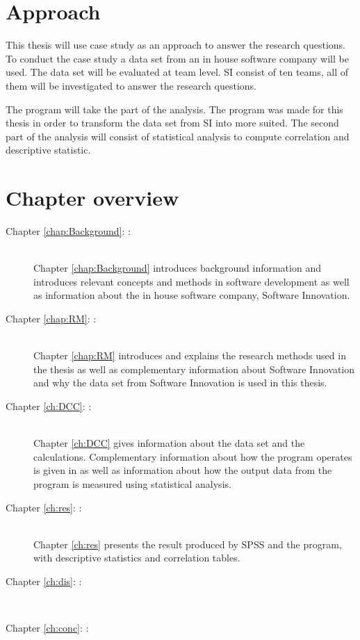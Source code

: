 \documentclass[UKenglish]{ifimaster}  %
\begin{document}
\section{Approach}
This thesis will use case study as an approach  to answer the research questions. To conduct the case study a data set from an in house software company will be used.  The data set will be evaluated at team level. SI consist of ten teams, all of them will be investigated to answer the research questions. 

The program will take the part of the analysis. The program was made for this thesis in order to transform the data set from SI into more suited. The second part of the analysis will consist of statistical analysis to compute correlation and descriptive statistic.
 

\section{Chapter overview}
\begin{description}
\item[Chapter \ref{chap:Background}: :] \hfill \\  
Chapter \ref{chap:Background} introduces background information and introduces relevant concepts and methods in software development as well as information about the in house software company, Software Innovation. 
\item[Chapter \ref{chap:RM}: :] \hfill \\  
Chapter \ref{chap:RM} introduces and explains the research methods used in the thesis as well as complementary information about Software Innovation and why the data set from Software Innovation is used in this thesis.  
\item[Chapter \ref{ch:DCC}: :] \hfill \\
Chapter \ref{ch:DCC} gives information about the data set and the calculations. Complementary information about how the program operates is given in as well as information about how the output data from the program is measured using statistical analysis. 

\item[Chapter \ref{ch:res}: :] \hfill \\
Chapter \ref{ch:res} presents the result produced by SPSS and the program, with descriptive statistics and correlation tables. 
\item[Chapter \ref{ch:dis}: :] \hfill \\
\item[Chapter \ref{ch:conc}: :] \hfill \\
\end{description}
\end{document}
